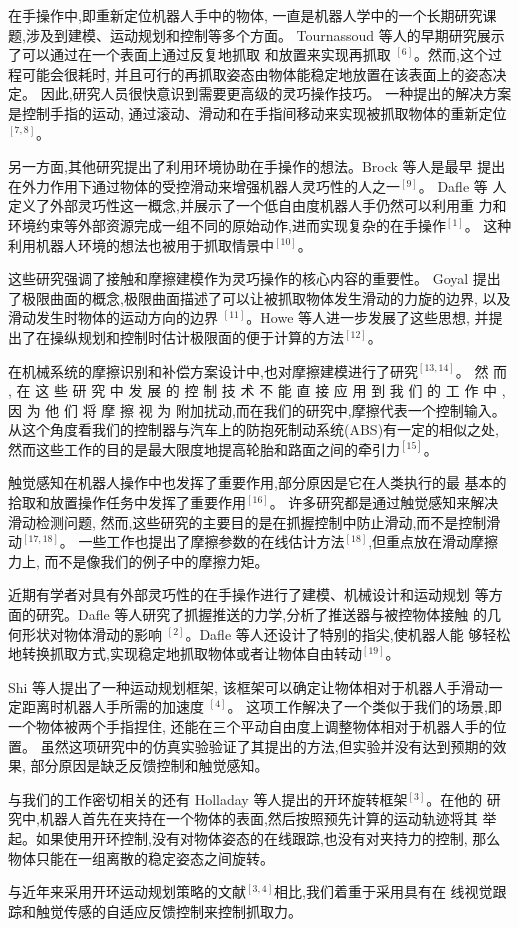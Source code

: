 在手操作中,即重新定位机器人手中的物体,
一直是机器人学中的一个长期研究课题,涉及到建模、运动规划和控制等多个方面。
Tournassoud 等人的早期研究展示了可以通过在一个表面上通过反复地抓取
和放置来实现再抓取 $^{[6]}$。然而,这个过程可能会很耗时,
并且可行的再抓取姿态由物体能稳定地放置在该表面上的姿态决定。
因此,研究人员很快意识到需要更高级的灵巧操作技巧。
一种提出的解决方案是控制手指的运动,
通过滚动、滑动和在手指间移动来实现被抓取物体的重新定位$^{[7, 8]}$。

另一方面,其他研究提出了利用环境协助在手操作的想法。Brock 等人是最早
提出在外力作用下通过物体的受控滑动来增强机器人灵巧性的人之一$^{[9]}$。 Dafle 等
人定义了外部灵巧性这一概念,并展示了一个低自由度机器人手仍然可以利用重
力和环境约束等外部资源完成一组不同的原始动作,进而实现复杂的在手操作$^{[1]}$。
这种利用机器人环境的想法也被用于抓取情景中$^{[10]}$。

这些研究强调了接触和摩擦建模作为灵巧操作的核心内容的重要性。 
Goyal 提出了极限曲面的概念,极限曲面描述了可以让被抓取物体发生滑动的力旋的边界,
以及滑动发生时物体的运动方向的边界 $^{[11]}$。Howe 等人进一步发展了这些思想,
并提出了在操纵规划和控制时估计极限面的便于计算的方法$^{[12]}$。

在机械系统的摩擦识别和补偿方案设计中,也对摩擦建模进行了研究$^{[13, 14]}$。
然 而 , 在 这 些 研 究 中 发 展 的 控 制 技 术 不 能 直 接 应 用 到 我 们 的 工 作 中 ,
因 为 他 们 将 摩 擦 视 为 附加扰动,而在我们的研究中,摩擦代表一个控制输入。
从这个角度看我们的控制器与汽车上的防抱死制动系统(ABS)有一定的相似之处,
然而这些工作的目的是最大限度地提高轮胎和路面之间的牵引力$^{[15]}$。

触觉感知在机器人操作中也发挥了重要作用,部分原因是它在人类执行的最
基本的拾取和放置操作任务中发挥了重要作用$^{[16]}$。
许多研究都是通过触觉感知来解决滑动检测问题,
然而,这些研究的主要目的是在抓握控制中防止滑动,而不是控制滑动$^{[17, 18]}$。
一些工作也提出了摩擦参数的在线估计方法$^{[18]}$,但重点放在滑动摩擦力上,
而不是像我们的例子中的摩擦力矩。

近期有学者对具有外部灵巧性的在手操作进行了建模、机械设计和运动规划
等方面的研究。Dafle 等人研究了抓握推送的力学,分析了推送器与被控物体接触
的几何形状对物体滑动的影响 $^{[2]}$。Dafle 等人还设计了特别的指尖,使机器人能
够轻松地转换抓取方式,实现稳定地抓取物体或者让物体自由转动$^{[19]}$。

Shi 等人提出了一种运动规划框架,
该框架可以确定让物体相对于机器人手滑动一定距离时机器人手所需的加速度 $^{[4]}$。
这项工作解决了一个类似于我们的场景,即一个物体被两个手指捏住,
还能在三个平动自由度上调整物体相对于机器人手的位置。
虽然这项研究中的仿真实验验证了其提出的方法,但实验并没有达到预期的效果,
部分原因是缺乏反馈控制和触觉感知。

与我们的工作密切相关的还有 Holladay 等人提出的开环旋转框架$^{[3]}$。在他的
研究中,机器人首先在夹持在一个物体的表面,然后按照预先计算的运动轨迹将其
举起。如果使用开环控制,没有对物体姿态的在线跟踪,也没有对夹持力的控制,
那么物体只能在一组离散的稳定姿态之间旋转。

与近年来采用开环运动规划策略的文献$^{[3,4]}$相比,我们着重于采用具有在
线视觉跟踪和触觉传感的自适应反馈控制来控制抓取力。

